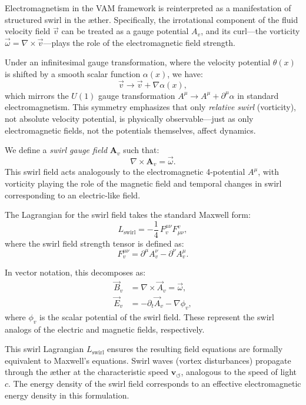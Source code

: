 Electromagnetism in the VAM framework is reinterpreted as a manifestation of structured swirl in the æther. Specifically, the irrotational component of the fluid velocity field \( \vec{v} \) can be treated as a gauge potential \( A_v \), and its curl—the vorticity \( \vec{\omega} = \nabla \times \vec{v} \)—plays the role of the electromagnetic field strength.

Under an infinitesimal gauge transformation, where the velocity potential \( \theta(x) \) is shifted by a smooth scalar function \( \alpha(x) \), we have:
\[
\vec{v} \to \vec{v} + \nabla \alpha(x),
\]
which mirrors the $U(1)$ gauge transformation \( A^\mu \to A^\mu + \partial^\mu \alpha \) in standard electromagnetism. This symmetry emphasizes that only \textit{relative swirl} (vorticity), not absolute velocity potential, is physically observable—just as only electromagnetic fields, not the potentials themselves, affect dynamics.

\vspace{1em}
We define a \emph{swirl gauge field} \( \mathbf{A}_v \) such that:
\[
\nabla \times \mathbf{A}_v = \vec{\omega}.
\]
This swirl field acts analogously to the electromagnetic 4-potential \( A^\mu \), with vorticity playing the role of the magnetic field and temporal changes in swirl corresponding to an electric-like field.

The Lagrangian for the swirl field takes the standard Maxwell form:
\begin{equation}
    L_{\text{swirl}} = -\frac{1}{4}\, F_{v}^{\mu\nu} F^{v}_{\mu\nu},
    \label{eq:swirl-lagrangian}
\end{equation}
where the swirl field strength tensor is defined as:
\[
F_v^{\mu\nu} = \partial^\mu A_v^\nu - \partial^\nu A_v^\mu.
\]

In vector notation, this decomposes as:
\begin{align*}
    \vec{B}_v &= \nabla \times \vec{A}_v = \vec{\omega}, \\
    \vec{E}_v &= -\partial_t \vec{A}_v - \nabla \phi_v,
\end{align*}
where \( \phi_v \) is the scalar potential of the swirl field. These represent the swirl analogs of the electric and magnetic fields, respectively.

\vspace{1em}
This swirl Lagrangian \( L_{\text{swirl}} \) ensures the resulting field equations are formally equivalent to Maxwell's equations. Swirl waves (vortex disturbances) propagate through the æther at the characteristic speed \( \mathbf{v}_{\scriptscriptstyle\boldsymbol{\circlearrowleft}} \), analogous to the speed of light \( c \). The energy density of the swirl field corresponds to an effective electromagnetic energy density in this formulation.

